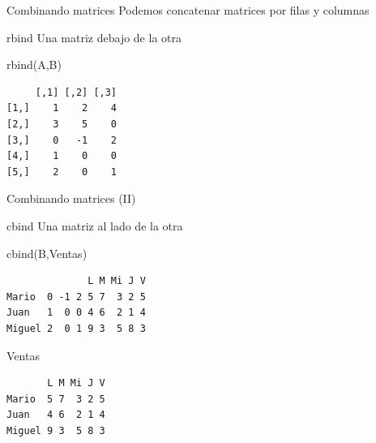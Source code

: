 \documentclass[
  ignorenonframetext,
  aspectratio=169,
  spanish,
]{beamer}
\newenvironment{Shaded}{\begin{snugshade}}{\end{snugshade}}
\newcommand{\FunctionTok}[1]{\textcolor[rgb]{0.28,0.35,0.67}{#1}}
\newcommand{\NormalTok}[1]{\textcolor[rgb]{0.00,0.23,0.31}{#1}}
\begin{document}
\begin{frame}[fragile]{Combinando matrices}
\label{combinando-matrices}
Podemos concatenar matrices por filas y columnas

\begin{block}{rbind}
\label{rbind}
Una matriz debajo de la otra

\begin{Shaded}
\begin{Highlighting}[]
\FunctionTok{rbind}\NormalTok{(A,B)}
\end{Highlighting}
\end{Shaded}

\begin{verbatim}
     [,1] [,2] [,3]
[1,]    1    2    4
[2,]    3    5    0
[3,]    0   -1    2
[4,]    1    0    0
[5,]    2    0    1
\end{verbatim}
\end{block}
\end{frame}

\begin{frame}[fragile]{Combinando matrices (II)}
\label{combinando-matrices-ii}
\begin{block}{cbind}
\label{cbind}
Una matriz al lado de la otra

\begin{Shaded}
\begin{Highlighting}[]
\FunctionTok{cbind}\NormalTok{(B,Ventas)}
\end{Highlighting}
\end{Shaded}

\begin{verbatim}
              L M Mi J V
Mario  0 -1 2 5 7  3 2 5
Juan   1  0 0 4 6  2 1 4
Miguel 2  0 1 9 3  5 8 3
\end{verbatim}

\begin{Shaded}
\begin{Highlighting}[]
\NormalTok{Ventas}
\end{Highlighting}
\end{Shaded}

\begin{verbatim}
       L M Mi J V
Mario  5 7  3 2 5
Juan   4 6  2 1 4
Miguel 9 3  5 8 3
\end{verbatim}
\end{block}
\end{frame}
\end{document}
